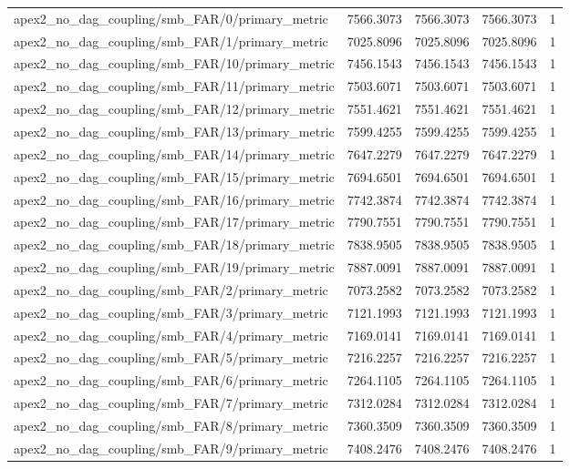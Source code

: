 \begin{table}[h]
\begin{tabular}{lrrrr}
apex2_no_dag_coupling/smb_FAR/0/primary_metric & 7566.3073 & 7566.3073 & 7566.3073 & 1 \\
apex2_no_dag_coupling/smb_FAR/1/primary_metric & 7025.8096 & 7025.8096 & 7025.8096 & 1 \\
apex2_no_dag_coupling/smb_FAR/10/primary_metric & 7456.1543 & 7456.1543 & 7456.1543 & 1 \\
apex2_no_dag_coupling/smb_FAR/11/primary_metric & 7503.6071 & 7503.6071 & 7503.6071 & 1 \\
apex2_no_dag_coupling/smb_FAR/12/primary_metric & 7551.4621 & 7551.4621 & 7551.4621 & 1 \\
apex2_no_dag_coupling/smb_FAR/13/primary_metric & 7599.4255 & 7599.4255 & 7599.4255 & 1 \\
apex2_no_dag_coupling/smb_FAR/14/primary_metric & 7647.2279 & 7647.2279 & 7647.2279 & 1 \\
apex2_no_dag_coupling/smb_FAR/15/primary_metric & 7694.6501 & 7694.6501 & 7694.6501 & 1 \\
apex2_no_dag_coupling/smb_FAR/16/primary_metric & 7742.3874 & 7742.3874 & 7742.3874 & 1 \\
apex2_no_dag_coupling/smb_FAR/17/primary_metric & 7790.7551 & 7790.7551 & 7790.7551 & 1 \\
apex2_no_dag_coupling/smb_FAR/18/primary_metric & 7838.9505 & 7838.9505 & 7838.9505 & 1 \\
apex2_no_dag_coupling/smb_FAR/19/primary_metric & 7887.0091 & 7887.0091 & 7887.0091 & 1 \\
apex2_no_dag_coupling/smb_FAR/2/primary_metric & 7073.2582 & 7073.2582 & 7073.2582 & 1 \\
apex2_no_dag_coupling/smb_FAR/3/primary_metric & 7121.1993 & 7121.1993 & 7121.1993 & 1 \\
apex2_no_dag_coupling/smb_FAR/4/primary_metric & 7169.0141 & 7169.0141 & 7169.0141 & 1 \\
apex2_no_dag_coupling/smb_FAR/5/primary_metric & 7216.2257 & 7216.2257 & 7216.2257 & 1 \\
apex2_no_dag_coupling/smb_FAR/6/primary_metric & 7264.1105 & 7264.1105 & 7264.1105 & 1 \\
apex2_no_dag_coupling/smb_FAR/7/primary_metric & 7312.0284 & 7312.0284 & 7312.0284 & 1 \\
apex2_no_dag_coupling/smb_FAR/8/primary_metric & 7360.3509 & 7360.3509 & 7360.3509 & 1 \\
apex2_no_dag_coupling/smb_FAR/9/primary_metric & 7408.2476 & 7408.2476 & 7408.2476 & 1 \\

\end{tabular}
\end{table}
